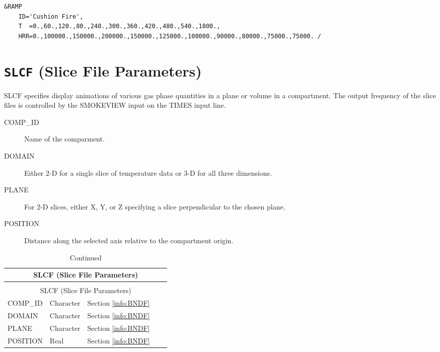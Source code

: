 \begin{lstlisting}
&RAMP 
	ID='Cushion Fire', 
	T  =0.,60.,120.,80.,240.,300.,360.,420.,480.,540.,1800.,
	HRR=0.,100000.,150000.,200000.,150000.,125000.,100000.,90000.,80000.,75000.,75000. /  
\end{lstlisting}

\vspace{\baselineskip}


\section{\texorpdfstring{{\tt SLCF}}{SLCF} (Slice File Parameters)}

SLCF specifies display animations of various gas phase quantities in a plane or volume in a compartment. The output frequency of the slice files is controlled by the SMOKEVIEW input on the TIMES input line.

\begin{adjustwidth}{1cm}{0cm}
\begin{description}
  \item[COMP\_ID] Name of the comparment.
  \item[DOMAIN] Either 2-D for a single slice of temperature data or 3-D for all three dimensions.
  \item[PLANE] For 2-D slices, either X, Y, or Z specifying a slice perpendicular to the chosen plane.
  \item[POSITION] Distance along the selected axis relative to the compartment origin.
\end{description}
\end{adjustwidth}

\vspace{\baselineskip}

\begin{longtable}{@{\extracolsep{\fill}}|l|l|l|l|l|}
\caption[Boundary file parameters ({\ct SLCF} namelist group)]{For more information see Section~\ref{info:BNDF}.}
\label{tbl:SLCF} \\
\hline
\multicolumn{5}{|c|}{{\ct SLCF} (Slice File Parameters)} \\
\hline \hline
\endfirsthead
\caption[]{Continued} \\
\hline
\multicolumn{5}{|c|}{{\ct SLCF} (Slice File Parameters)} \\
\hline \hline
\endhead
{\ct COMP\_ID}        & Character   & Section \ref{info:BNDF}                 &           &                 \\ \hline
{\ct DOMAIN}            & Character   & Section \ref{info:BNDF}                 &           &                 \\ \hline
{\ct PLANE}             & Character   & Section \ref{info:BNDF}                 &           &                 \\ \hline
{\ct POSITION}          & Real        & Section \ref{info:BNDF}                 &           &                 \\ \hline
\end{longtable}

